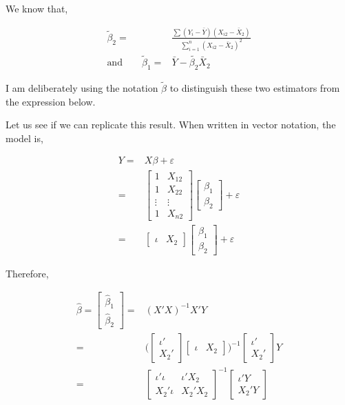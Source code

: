 \documentclass[
  letterpaper,
  DIV=11,
  numbers=noendperiod]{scrreprt}
\begin{document}
We know that,

\[
\begin{align}
\tilde{\beta}_2 =& \frac{\sum(Y_i-\bar{Y})(X_{i2}-\bar{X}_2)}{\sum_{i=1}^n(X_{i2}-\bar{X}_2)^2} \\
\text{and}\qquad \tilde{\beta}_1 =& \bar{Y}-\tilde{\beta_2}\bar{X}_2
\end{align}
\]

I am deliberately using the notation \(\tilde{\beta}\) to distinguish
these two estimators from the expression below.

Let us see if we can replicate this result. When written in vector
notation, the model is,

\[
\begin{align}
Y =& X\beta+\varepsilon \\
=& \begin{bmatrix}1&X_{12} \\ 1 & X_{22} \\ \vdots & \vdots \\ 1 & X_{n2}\end{bmatrix}\begin{bmatrix}\beta_1 \\ \beta_2 \end{bmatrix} + \varepsilon \\
=& \begin{bmatrix}\iota &X_{2} \end{bmatrix}\begin{bmatrix}\beta_1 \\ \beta_2 \end{bmatrix} + \varepsilon
\end{align}
\]

Therefore,

\[
\begin{align} 
\hat{\beta} = \begin{bmatrix}\hat{\beta}_1 \\ \hat{\beta}_2\end{bmatrix}=&(X'X)^{-1}X'Y \\
=&\bigg(\begin{bmatrix}\iota' \\ X_{2}' \end{bmatrix}\begin{bmatrix}\iota &X_{2}\end{bmatrix}\bigg)^{-1}\begin{bmatrix}\iota'  \\ X_{2}' \end{bmatrix}Y \\
=&\begin{bmatrix}\iota'\iota & \iota'X_2 \\ X_{2}'\iota & X_2'X_2 \end{bmatrix}^{-1}\begin{bmatrix}\iota'Y  \\ X_{2}'Y \end{bmatrix}
\end{align} 
\]
\end{document}
